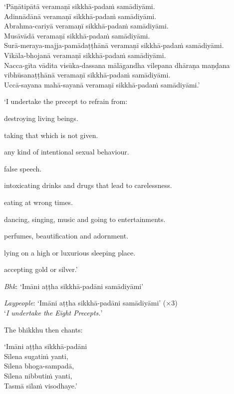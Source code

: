 ‘Pāṇātipātā veramaṇī sikkhā-padaṁ samādiyāmi.\\
Adinnādānā veramaṇī sikkhā-padaṁ samādiyāmi.\\
Abrahma-cariyā veramaṇī sikkhā-padaṁ samādiyāmi.\\
Musāvādā veramaṇī sikkhā-padaṁ samādiyāmi.\\
Surā-meraya-majja-pamādaṭṭhānā veramaṇī sikkhā-padaṁ samādiyāmi.\\
Vikāla-bhojanā veramaṇī sikkhā-padaṁ samādiyāmi.\\
Nacca-gīta vādita visūka-dassana mālāgandha vilepana dhāraṇa maṇḍana
vibhūsanaṭṭhānā veramaṇī sikkhā-padaṁ samādiyāmi.\\
Uccā-sayana mahā-sayanā veramaṇī sikkhā-padaṁ samādiyāmi.’


{\itshape

‘I undertake the precept to refrain from:

\begin{packeditemize}

\item destroying living beings.
\item taking that which is not given.
\item any kind of intentional sexual behaviour.
\item false speech.
\item intoxicating drinks and drugs that lead to carelessness.
\item eating at wrong times.
\item dancing, singing, music and going to entertainments.
\item perfumes, beautification and adornment.
\item lying on a high or luxurious sleeping place.
\item accepting gold or silver.’

\end{packeditemize}

}

\emph{Bhk}: ‘Imāni aṭṭha sikkhā-padāni samādiyāmi’

\emph{Laypeople}: ‘Imāni aṭṭha sikkhā-padāni samādiyāmi’ (×3)\\
‘\emph{I undertake the Eight Precepts.}’

The bhikkhu then chants:

‘Imāni aṭṭha sikkhā-padāni\\
Sīlena sugatiṁ yanti,\\
Sīlena bhoga-sampadā,\\
Sīlena nibbutiṁ yanti,\\
Tasmā sīlaṁ visodhaye.’

